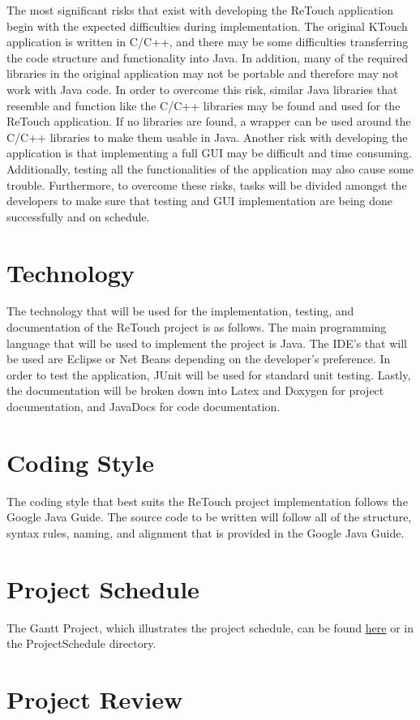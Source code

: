 \documentclass{article}
\begin{document}
    The most significant risks that exist with developing the ReTouch application begin with the expected difficulties during implementation. The original KTouch application is written in C/C++, and there may be some difficulties transferring the code structure and functionality into Java. In addition, many of the required libraries in the original application may not be portable and therefore may not work with Java code. In order to overcome this risk, similar Java libraries that resemble and function like the C/C++ libraries may be found and used for the ReTouch application. If no libraries are found, a wrapper can be used around the C/C++ libraries to make them usable in Java. Another risk with developing the application is that implementing a full GUI may be difficult and time consuming. Additionally, testing all the functionalities of the application may also cause some trouble. Furthermore, to overcome these risks, tasks will be divided amongst the developers to make sure that testing and GUI implementation are being done successfully and on schedule.


\section{Technology}

    The technology that will be used for the implementation, testing, and documentation of the ReTouch project is as follows. The main programming language that will be used to implement the project is Java. The IDE's that will be used are Eclipse or Net Beans depending on the developer's preference. In order to test the application, JUnit will be used for standard unit testing. Lastly, the documentation will be broken down into Latex and Doxygen for project documentation, and JavaDocs for code documentation.

\section{Coding Style}

    The coding style that best suits the ReTouch project implementation follows the Google Java Guide. The source code to be written will follow all of the structure, syntax rules, naming, and alignment that is provided in the Google Java Guide. 

\section{Project Schedule}

The Gantt Project, which illustrates the project schedule, can be found 
\href{https://gitlab.cas.mcmaster.ca/munimm/3XA3_Project/blob/master/ProjectSchedule/Gantt_Project_Revision_0.gan}{here} or in the ProjectSchedule directory. 


\section{Project Review}
\end{document}
